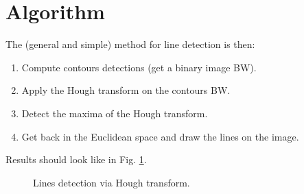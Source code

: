 \vspace*{-10pt}

\section{Algorithm}
The (general and simple) method for line detection is then:
\begin{enumerate}
 \item Compute contours detections (get a binary image BW).
 \item Apply the Hough transform on the contours BW.
 \item Detect the maxima of the Hough transform.
 \item Get back in the Euclidean space and draw the lines on the image.
\end{enumerate}
Results should look like in Fig. \ref{fig:tutorial:hough:results}.

\begin{figure}[htbp]
 \centering\caption{Lines detection via Hough transform.}
 \hfill
 \hspace*{-2pt}\null
 \label{fig:tutorial:hough:results}
\end{figure}


